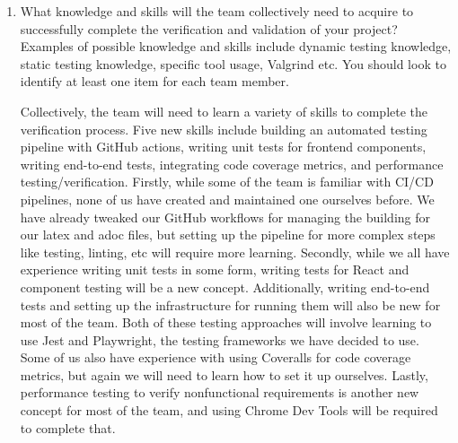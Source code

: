\documentclass[12pt, titlepage]{article}
\begin{document}
\begin{enumerate}
\begin{itemize}
    \item Jeffrey - During this deliverable, I found that coordinating with
      the team was a little more difficult that usual. This is due to the fact
      that a lot of us had other course work and midterms happening during
      the creation of our VnV Plan. In order to resolve this issue, the team
      decided that each member should list their availability and schedules
      so we could properly organize a date and time that works best for
      everyone. In the past, it was a bit easier where we could
      propose a day and see if the team is available. This time around, we
      had to check availability first before proposing a day to meet. I found
      this solution to be very effective and will definetely use this
      when our schedules get busier.
    \item Kevin - The main pain point of this deliverable was balancing it along with all of the other work I
    have from other classes. I had to find time to finish this deliverable along with other assignments,
    midterms, labs and mettings for other projects.
  \end{itemize}
  \item What knowledge and skills will the team collectively need to acquire to
  successfully complete the verification and validation of your project?
  Examples of possible knowledge and skills include dynamic testing knowledge,
  static testing knowledge, specific tool usage, Valgrind etc.  You should look to
  identify at least one item for each team member.

    Collectively, the team will need to learn a variety of skills to complete
    the verification process. Five new skills include building an automated
    testing pipeline with GitHub actions, writing unit tests for frontend
    components, writing end-to-end tests, integrating code coverage metrics,
    and performance testing/verification. Firstly, while some of the team is
    familiar with CI/CD pipelines, none of us have created and maintained one
    ourselves before. We have already tweaked our GitHub workflows for managing
    the building for our latex and adoc files, but setting up the pipeline for
    more complex steps like testing, linting, etc will require more learning.
    Secondly, while we all have experience writing unit tests in some form,
    writing tests for React and component testing will be a new concept.
    Additionally, writing end-to-end tests and setting up the infrastructure
    for running them will also be new for most of the team. Both of these
    testing approaches will involve learning to use Jest and Playwright, the
    testing frameworks we have decided to use. Some of us also have experience
    with using Coveralls for code coverage metrics, but again we will need to
    learn how to set it up ourselves. Lastly, performance testing to verify
    nonfunctional requirements is another new concept for most of the team, and
    using Chrome Dev Tools will be required to complete that.


\end{enumerate}
\end{document}
